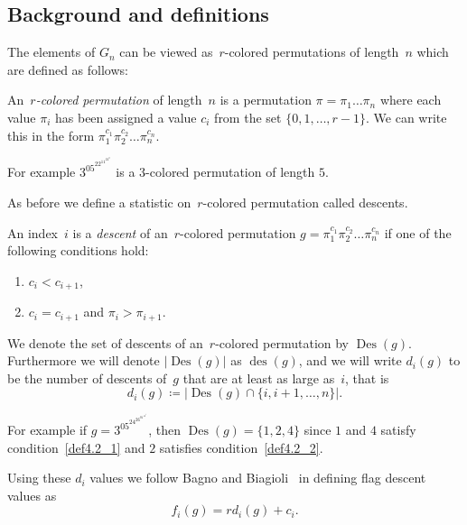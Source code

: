 \documentclass[ALCO,ThmDefs,Unicode,epreuves]{cedram}
\DeclareMathOperator{\Des}{Des}
\DeclareMathOperator{\des}{des}
\begin{document}
\subsection{Background and definitions}

The elements of $G_n$ can be viewed as~$r$-colored permutations of length~$n$ which are defined as follows:

	\begin{defi}

		An~\emph{$r$-colored permutation} of length~$n$ is a permutation $\pi=\pi_1\ldots \pi_n$ where each value $\pi_i$ has 
been assigned a value $c_i$ from the set $\{0,1,\ldots, r-1\}$. We can write this in the form 
$\pi_1^{c_1}\pi_2^{c_2}\ldots \pi_n^{c_n}$.
		
	\end{defi}

	For example $3^05^22^11^24^0$ is a $3$-colored permutation of length $5$.

	As before we define a statistic on~$r$-colored permutation called descents.

	\begin{defi}
	An index~$i$ is a \emph{descent} of an~$r$-colored permutation $g=\pi_1^{c_1}\pi_2^{c_2}\ldots \pi_n^{c_n}$ if one of the 
following conditions hold: 
\begin{enumerate}
\item\label{def4.2_1} $c_i<c_{i+1}$,
\item\label{def4.2_2} $c_i=c_{i+1}$ and $\pi_i>\pi_{i+1}$.
\end{enumerate}


 We denote the set of descents of an~$r$-colored permutation by $\Des (g)$. Furthermore we will denote $\vert \Des (g)\vert$ as 
$\des (g)$, and we will write $d_i(g)$ to be the number of descents of~$g$ that are at least as large as~$i$, that 
is
\begin{equation}
d_i(g)\coloneqq \vert \Des (g)\cap \{i,i+1,\ldots, n\}\vert.
\end{equation}
		

	\end{defi}

	For example if $g=3^05^24^26^01^12^1$, then $\Des (g)=\{1,2,4\}$ since $1$ and $4$ satisfy condition~\eqref{def4.2_1} and $2$ satisfies 
condition~\eqref{def4.2_2}.

	Using these $d_i$ values we follow Bagno and Biagioli~\cite{BB} in defining flag descent values 
as
\begin{equation}
f_i(g)=rd_i(g)+c_i.
\end{equation} 
\end{document}
